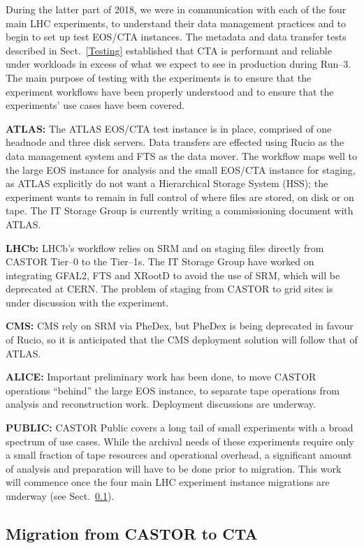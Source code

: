 \documentclass{webofc}
\begin{document}
During the latter part of 2018, we were in communication with each of the four main LHC experiments, to understand
their data management practices and to begin to set up test EOS/CTA instances. The metadata and data transfer tests described in
Sect.~\ref{Testing} established that CTA is performant and reliable under workloads in excess of what we expect to see in production
during Run--3. The main purpose of testing with the experiments is to ensure that the experiment workflows have been properly
understood and to ensure that the experiments' use cases have been covered.

\textbf{ATLAS:} The ATLAS EOS/CTA test instance is in place, comprised of one headnode and three disk servers. Data transfers are
effected using Rucio as the data management system and FTS as the data mover. The workflow maps well to the large EOS instance
for analysis and the small EOS/CTA instance for staging, as ATLAS explicitly do not want a Hierarchical Storage System (HSS);
the experiment wants to remain in full control of where files are stored, on disk or on tape. The IT Storage Group is currently
writing a commissioning document with ATLAS.

\textbf{LHCb:} LHCb's workflow relies on SRM and on staging files directly from CASTOR Tier--0 to the Tier--1s. The IT Storage Group
have worked on integrating GFAL2, FTS and XRootD to avoid the use of SRM, which will be deprecated at CERN. The problem of staging from
CASTOR to grid sites is under discussion with the experiment.

\textbf{CMS:} CMS rely on SRM via PheDex, but PheDex is being deprecated in favour of Rucio, so it is anticipated that the CMS
deployment solution will follow that of ATLAS.

\textbf{ALICE:} Important preliminary work has been done, to move CASTOR operations ``behind'' the large EOS instance, to separate
tape operations from analysis and reconstruction work. Deployment discussions are underway.

\textbf{PUBLIC:} CASTOR Public covers a long tail of small experiments with a broad spectrum of use cases. While the archival needs
of these experiments require only a small fraction of tape resources and operational overhead, a significant amount of analysis
and preparation will have to be done prior to migration. This work will commence once the four main LHC experiment instance
migrations are underway (see Sect.~\ref{Migration_from_CASTOR_to_CTA}).

\subsection{Migration from CASTOR to CTA}
\label{Migration_from_CASTOR_to_CTA}
\end{document}
